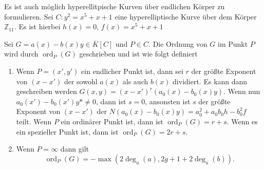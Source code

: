 \begin{example}
  Es ist auch möglich hyperellitpische Kurven über endlichen Körper zu formulieren. Sei $C:y^2=x^5+x+1$ eine hyperelliptische Kurve über dem Körper $\mathbb{Z}_{11}$. Es ist hierbei $h(x)=0$, $f(x)=x^5+x+1$
\end{example}
\begin{definition}\label{def:ord-punkt}
  Sei $G=a(x)-b(x)y\in \overline{K}[C]$ und $P\in C$. Die Ordnung von $G$ im Punkt $P$ wird durch $\operatorname{ord}_P(G)$ geschrieben und ist wie folgt definiert
  \begin{enumerate}
    \item Wenn $P=(x',y')$ ein endlicher Punkt ist, dann sei $r$ der größte Exponent von $(x-x')$ der sowohl $a(x)$ als auch $b(x)$ dividiert. Es kann dann geschreiben werden $G(x,y)=(x-x')^r (a_0(x)-b_0(x)y)$. Wenn nun $a_0(x')-b_0(x')y*\neq 0$, dann ist $s=0$, ansonsten ist $s$ der größte Exponent von $(x-x')$ der $N(a_0(x)-b_0(x)y)=a_0^2+a_0b_0h-b_0^2f$ teilt. Wenn $P$ ein ordinärer Punkt ist, dann ist $\operatorname{ord}_P(G)=r+s$. Wenn es ein spezieller Punkt ist, dann ist $\operatorname{ord}_P(G)=2r+s$.
    \item Wenn $P=\infty$ dann gilt
          \[
            \operatorname{ord}_P(G)=-\max(2\deg_u(a),2g+1+2\deg_u(b)).
          \]
  \end{enumerate}
\end{definition}

